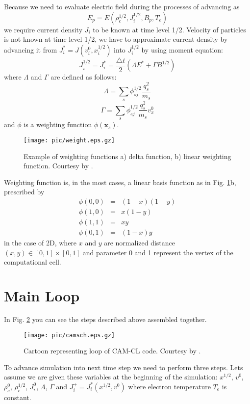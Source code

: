 \documentclass[oneside,branding,toc,article]{sat}
\begin{document}
Because we need to evaluate electric field during the processes of advancing as
\begin{equation}
  E_p = E (\rho_c^{1/2}, J_i^{1/2}, B_p, T_e)
\end{equation}
we require current density $J_i$ to be known at time level 1/2. Velocity of
particles is not known at time level 1/2, we have to approximate current
density by advancing it from $J_i^* = J (v_i^{0}, x_i^{1/2})$ into $J_i^{1/2}$
by using moment equation:
\begin{equation}
  \label{eq:curradv}
  J_i^{1/2} = J_i^* = \frac{\triangle t}{2} (\Lambda E^* + \Gamma B^{1/2})
\end{equation}
where $\Lambda$ and $\Gamma$ are defined as follows:
\begin{equation}
  \label{eq:lambda}
  \Lambda = \sum_s \phi_{sj}^{1/2} \frac{q_s^2}{m_s}
\end{equation}
\begin{equation}
  \label{eq:lambda}
  \Gamma = \sum_s \phi_{sj}^{1/2} \frac{q_s^2}{m_s} v_x^0
\end{equation}
and $\phi$ is a weighting function $\phi (\mathbf{x}_s)$.
\begin{figure}[!h]
  \centering
  \texttt{[image: pic/weight.eps.gz]}
  \caption{Example of weighting functions a) delta function, b) linear
    weighting function. Courtesy by \cite{bila85}.}
  \label{fig:weight}
\end{figure}
Weighting function is, in the most cases, a linear basis function as in
Fig. \ref{fig:weight}b, prescribed by
\begin{eqnarray}
  \label{eq:weight}
  \phi (0,0) & = & (1-x)(1-y) \nonumber \\
  \phi (1,0) & = & x(1-y)     \nonumber \\
  \phi (1,1) & = & xy         \nonumber \\
  \phi (0,1) & = & (1-x)y
  \end{eqnarray}
in the case of 2D, where $x$ and $y$ are normalized distance $(x,y) \in [0,1]
\times [0,1]$ and parameter 0 and 1 represent the vertex of the computational
cell.

\section{Main Loop}

In Fig. \ref{fig:loop} you can see the steps described above assembled
together.
\begin{figure}[!h]
  \centering
  \texttt{[image: pic/camsch.eps.gz]}
  \caption{Cartoon representing loop of CAM-CL code. Courtesy by
    \cite{matthews94}.}
  \label{fig:loop}
\end{figure}
To advance simulation into next time step we need to perform three steps.  Lets
assume we are given these variables at the beginning of the simulation:
$x^{1/2}$, $v^0$, $\rho_c^{0}$, $\rho_c^{1/2}$, $J_i^0$, $\Lambda$, $\Gamma$
and $J_i^+ = J_i^* (x^{1/2},v^0)$ where electron temperature $T_e$ is constant.
\end{document}
